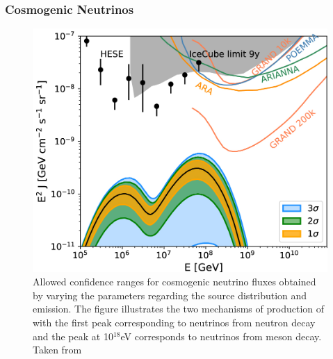 \subsubsection*{Cosmogenic Neutrinos}
\label{subsubsec:CosmoNu}

\begin{figure}[t!]
  \centering
  \includegraphics[width=14.5cm]{thesis_figures/CRnNu/apjab05cef9_hr.jpg}
  \caption{Allowed confidence ranges for cosmogenic neutrino fluxes obtained by varying the parameters regarding the source distribution and emission. The figure illustrates the two mechanisms of production of with the first peak corresponding to neutrinos from neutron decay and the peak at 10$^{18}$eV corresponds to neutrinos from meson decay. Taken from~\cite{Heinze:2019jou}}
  \label{fig:model_nu_auger_mixed}
\end{figure}

